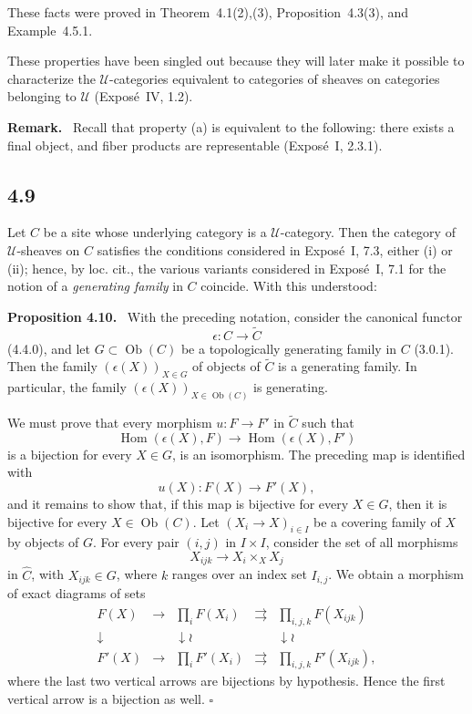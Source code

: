\documentclass[11pt]{article}
\newcommand{\U}{\mathcal{U}}
\newcommand{\Hom}{\operatorname{Hom}}
\newcommand{\Ob}{\operatorname{Ob}}
\newcommand{\qedtext}{\hfill\(\square\)}
\newenvironment{statement}[1]{\par\medskip\noindent\textbf{#1.}\ }{\par\medskip}
\newenvironment{remarktext}[1]{\par\medskip\noindent\textbf{#1.}\ }{\par\medskip}
\begin{document}
These facts were proved in Theorem~4.1(2),(3), Proposition~4.3(3), and Example~4.5.1.

These properties have been singled out because they will later make it possible to characterize the \(\U\)-categories equivalent to categories of sheaves on categories belonging to \(\U\) (Expos\'e~IV, 1.2).

\begin{remarktext}{Remark}
Recall that property (a) is equivalent to the following: there exists a final object, and fiber products are representable (Expos\'e~I, 2.3.1).
\end{remarktext}

\subsection*{4.9}
Let \(C\) be a site whose underlying category is a \(\U\)-category. Then the category of \(\U\)-sheaves on \(C\) satisfies the conditions considered in Expos\'e~I, 7.3, either (i) or (ii); hence, by loc. cit., the various variants considered in Expos\'e~I, 7.1 for the notion of a \emph{generating family} in \(C\) coincide. With this understood:

\begin{statement}{Proposition 4.10}
With the preceding notation, consider the canonical functor
\[
\epsilon:C\to\widetilde C
\]
(4.4.0), and let \(G\subset\Ob(C)\) be a topologically generating family in \(C\) (3.0.1). Then the family \((\epsilon(X))_{X\in G}\) of objects of \(\widetilde C\) is a generating family. In particular, the family \((\epsilon(X))_{X\in\Ob(C)}\) is generating.
\end{statement}

We must prove that every morphism \(u:F\to F'\) in \(\widetilde C\) such that
\[
\Hom(\epsilon(X),F)\longrightarrow \Hom(\epsilon(X),F')
\tag{4.10.1}
\]
is a bijection for every \(X\in G\), is an isomorphism. The preceding map is identified with
\[
u(X):F(X)\longrightarrow F'(X),
\tag{4.10.2}
\]
and it remains to show that, if this map is bijective for every \(X\in G\), then it is bijective for every \(X\in\Ob(C)\). Let \((X_i\to X)_{i\in I}\) be a covering family of \(X\) by objects of \(G\). For every pair \((i,j)\) in \(I\times I\), consider the set of all morphisms
\[
X_{ijk}\to X_i\times_XX_j
\]
in \(\widehat C\), with \(X_{ijk}\in G\), where \(k\) ranges over an index set \(I_{i,j}\). We obtain a morphism of exact diagrams of sets
\[
\begin{array}{ccccc}
F(X)&\to&\displaystyle\prod_iF(X_i)&\rightrightarrows&\displaystyle\prod_{i,j,k}F(X_{ijk})\\
\downarrow&&\downarrow\wr&&\downarrow\wr\\
F'(X)&\to&\displaystyle\prod_iF'(X_i)&\rightrightarrows&\displaystyle\prod_{i,j,k}F'(X_{ijk}),
\end{array}
\]
where the last two vertical arrows are bijections by hypothesis. Hence the first vertical arrow is a bijection as well. \qedtext
\end{document}
